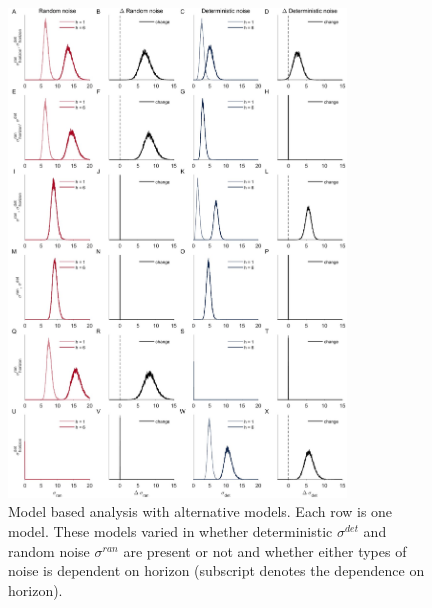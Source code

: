 \documentclass[12pt]{article}
\begin{document}
	
	\begin{figure}[hp]
		\begin{center}
			\includegraphics[width=0.8\textwidth]{figures/RDBayes_2noise_hyperpriors_6model.jpg}
			\caption{Model based analysis with alternative models. Each row is one model. These models varied in whether deterministic $\sigma^{det}$ and random noise $\sigma^{ran}$ are present or not and whether either types of noise is dependent on horizon (subscript denotes the dependence on horizon). }
			\label{fig:sixmodels}
		\end{center}
	\end{figure}
\end{document}
